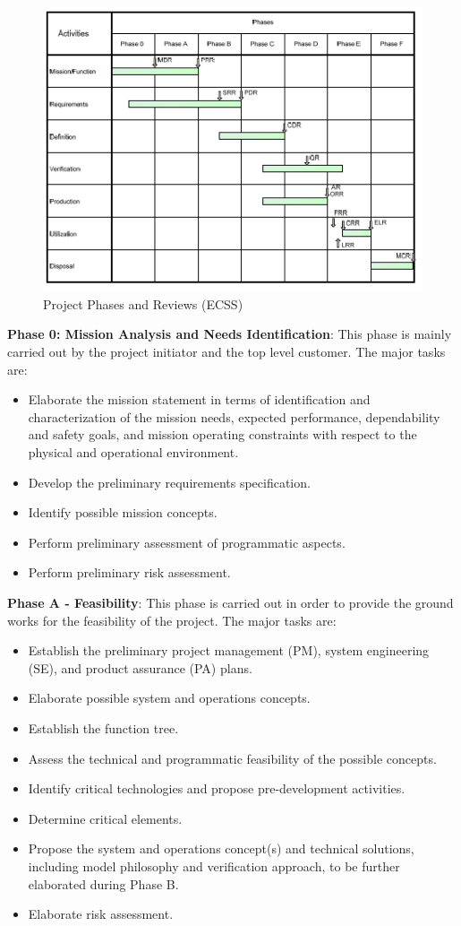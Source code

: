 \begin{figure}[h]
\centering\includegraphics[scale=1.0]{fig/project_phases_and_reviews}
\caption{Project Phases and Reviews (ECSS)}
\label{fig:Project Phases and Reviews}
\end{figure}

\textbf{Phase 0: Mission Analysis and Needs Identification}: This phase is mainly carried out by the project initiator and the top level customer. The major tasks are:
\begin{itemize}
\item Elaborate the mission statement in terms of identification and characterization of the mission needs, expected performance, dependability and safety goals, and mission operating constraints with respect to the physical and operational environment.
\item Develop the preliminary requirements specification.
\item Identify possible mission concepts.
\item Perform preliminary assessment of programmatic aspects.
\item Perform preliminary risk assessment.
\end{itemize}

\textbf{Phase A - Feasibility}: This phase is carried out in order to provide the ground works for the feasibility of the project. The major tasks are:
\begin{itemize}
\item Establish the preliminary project management (PM), system engineering (SE), and product assurance (PA) plans.
\item Elaborate possible system and operations concepts.
\item Establish the function tree.
\item Assess the technical and programmatic feasibility of the possible concepts.
\item Identify critical technologies and propose pre-development activities.
\item Determine critical elements.
\item Propose the system and operations concept(s) and technical solutions, including model philosophy and verification approach, to be further elaborated during Phase B.
\item Elaborate risk assessment.
\end{itemize}

